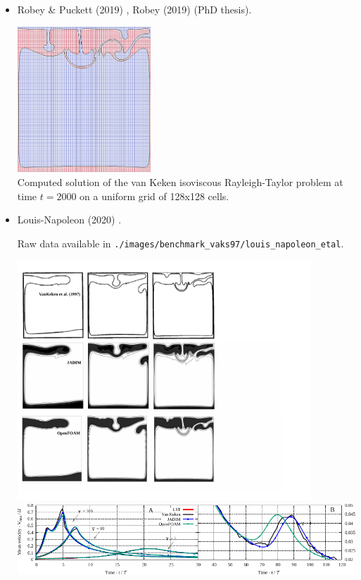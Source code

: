 \begin{itemize}
\item Robey \& Puckett (2019) \cite{ropu19}, Robey (2019) \cite{robe19} (PhD thesis).

\begin{center}
\includegraphics[width=5cm]{images/benchmark_vaks97/ropu19}\\
{\captionfont Computed solution of the van Keken isoviscous Rayleigh-Taylor problem
at time $t = 2000$ on a uniform grid of 128x128 cells. }
\end{center}



\item Louis-Napoleon \etal (2020) \cite{logb20}.

Raw data available in {\tt ./images/benchmark\_vaks97/louis\_napoleon\_etal}.

\begin{center}
\includegraphics[width=11cm]{images/benchmark_vaks97/louis_napoleon_etal/VK1}\\
\includegraphics[width=14cm]{images/benchmark_vaks97/louis_napoleon_etal/VKzoom}
\end{center}


\end{itemize}

